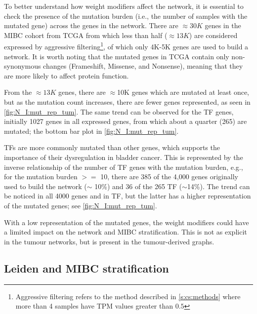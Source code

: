 To better understand how weight modifiers affect the network, it is essential to check the presence of the mutation burden (i.e., the number of samples with the mutated gene) across the genes in the network. There are $\approx30K$ genes in the MIBC cohort from TCGA from which less than half ($\approx13K$) are considered expressed by aggressive filtering\footnote{Aggressive filtering refers to the method described in \cref{s:cs:methods} where more than 4 samples have TPM values greater than $0.5$}, of which only 4K-5K genes are used to build a network. It is worth noting that the mutated genes in TCGA contain only non-synonymous changes (Frameshift, Missense, and Nonsense), meaning that they are more likely to affect protein function.

From the $\approx13K$ genes, there are $\approx$10K genes which are mutated at least once, but as the mutation count increases, there are fewer genes represented, as seen in \cref{fig:N_I:mut_rep_tum}. The same trend can be observed for the TF genes, initially 1027 genes in all expressed genes, from which about a quarter (265) are mutated; the bottom bar plot in \cref{fig:N_I:mut_rep_tum}.

TFs are more commonly mutated than other genes, which supports the importance of their dysregulation in bladder cancer. This is represented by the inverse relationship of the number of TF genes with the mutation burden, e.g., for the mutation burden $>=$ 10, there are 385 of the 4,000 genes originally used to build the network ($\sim$ 10\%) and 36 of the 265 TF ($\sim$14\%). The trend can be noticed in all 4000 genes and in TF, but the latter has a higher representation of the mutated genes; see \cref{fig:N_I:mut_rep_tum}. 

With a low representation of the mutated genes, the weight modifiers could have a limited impact on the network and MIBC stratification. This is not as explicit in the tumour networks, but is present in the tumour-derived graphs.


\subsection{Leiden and MIBC stratification} \label{s:N_I:tum_stratification}

